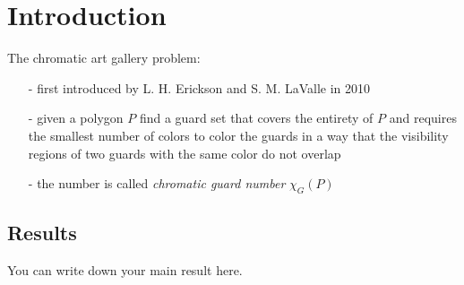 \chapter{Introduction}
The chromatic art gallery problem:
\begin{enumerate}
    \item[-] first introduced by L. H. Erickson and S. M. LaValle in 2010 \cite{erickson2010chromatic}
    \item[-] given a polygon $P$ find a guard set that covers the entirety of $P$ and requires the smallest number of colors to color the guards in a way that the visibility regions of two guards with the same color do not overlap
    \item[-] the number is called \emph{chromatic guard number} $\chi_G(P)$ 
\end{enumerate}

\section{Results}
You can write down your main result here.

